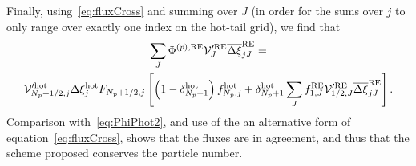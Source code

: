 \documentclass{notes}
\newcommand{\Vp}{\mathcal{V}'}
\begin{document}
    Finally, using~\eqref{eq:fluxCross} and summing over $J$ (in order for the
    sums over $j$ to only range over exactly one index on the hot-tail grid), we
    find that
    \begin{equation}
        \begin{gathered}
            \sum_J \Phi^{(p),{\rm RE}} \Vp^{\rm RE}_J \overline{\Delta\xi}_{jJ}^{\rm RE} =\\
             \Vp^{\rm hot}_{N_p+1/2,j}\Delta\xi_j^{\rm hot} F_{N_p+1/2,j}\left[
                \left( 1-\delta^{\rm hot}_{N_p+1} \right) f^{\rm hot}_{N_p,j} +
                \delta^{\rm hot}_{N_p+1}\sum_J f_{1,J}^{\rm RE}\Vp^{\rm RE}_{1/2,J}
                \overline{\Delta\xi}^{\rm RE}_{jJ}
            \right].
        \end{gathered}
    \end{equation}
    Comparison with~\eqref{eq:PhiPhot2}, and use of the an alternative form of
    equation~\eqref{eq:fluxCross}, shows that the fluxes are in agreement, and
    thus that the scheme proposed conserves the particle number.
\end{document}
